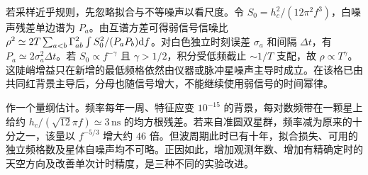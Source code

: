 若采样近乎规则，先忽略拟合与不等噪声以看尺度。令 $S_0=h_c^2/(12\pi^2 f^3)$，白噪声残差单边谱为 $P_a$。由互谱方差可得弱信号信噪比 $\rho^2\simeq2T\sum_{a<b}\Gamma_{ab}^2\int S_0^2/(P_aP_b)\dd f$。对白色独立时刻误差 $\sigma_a$ 和间隔 $\Delta t$，有 $P_a\simeq2\sigma_a^2\Delta t$。若 $S_0\propto f^{-\gamma}$ 且 $\gamma>1/2$，积分受低频截止 $\sim1/T$ 支配，故 $\rho\propto T^\gamma$。这陡峭增益只在新增的最低频格依然由仪器或脉冲星噪声主导时成立。在该格已由共同红背景主导后，分母也随信号增大，不能继续使用弱信号的时间幂律。

作一个量纲估计。频率每年一周、特征应变 $10^{-15}$ 的背景，每对数频带在一颗星上给约 $h_c/(\sqrt{12}\pi f)\simeq3\,\mathrm{ns}$ 的均方根残差。若来自准圆双星群，频率减为原来的十分之一，该量以 $f^{-5/3}$ 增大约 $46$ 倍。但波周期此时已有十年，拟合损失、可用的独立频格数及星体自噪声均不可略。正因如此，增加观测年数、增加有精确定时的天空方向及改善单次计时精度，是三种不同的实验改进。
